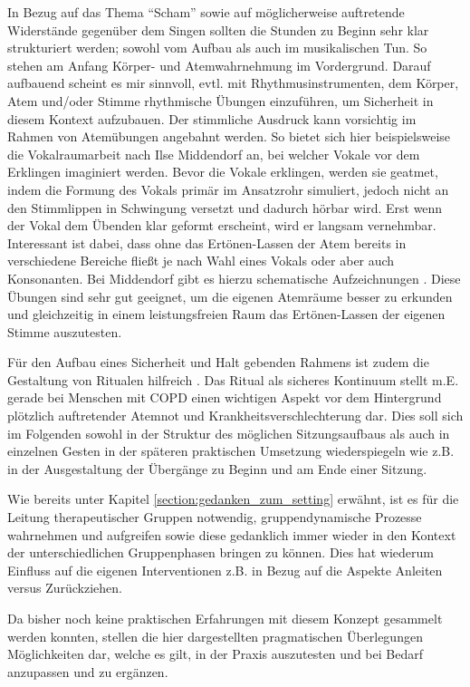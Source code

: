 In Bezug auf das Thema "`Scham"' sowie auf möglicherweise auftretende Widerstände gegenüber dem Singen sollten die Stunden zu Beginn sehr klar strukturiert werden; sowohl vom Aufbau als auch im musikalischen Tun. So stehen am Anfang Körper- und Atemwahrnehmung im Vordergrund. Darauf aufbauend scheint es mir sinnvoll, evtl. mit Rhythmusinstrumenten, dem Körper, Atem und/oder Stimme rhythmische Übungen einzuführen, um Sicherheit in diesem Kontext aufzubauen. Der stimmliche Ausdruck kann vorsichtig im Rahmen von Atemübungen angebahnt werden. So bietet sich hier beispielsweise die Vokalraumarbeit nach Ilse Middendorf an, bei welcher Vokale vor dem Erklingen imaginiert werden. Bevor die Vokale erklingen, werden sie geatmet, indem die Formung des Vokals primär im Ansatzrohr simuliert, jedoch nicht an den Stimmlippen in Schwingung versetzt und dadurch hörbar wird. Erst wenn der Vokal dem Übenden klar geformt erscheint, wird er langsam vernehmbar. Interessant ist dabei, dass ohne das Ertönen-Lassen der Atem bereits in verschiedene Bereiche fließt je nach Wahl eines Vokals oder aber auch Konsonanten. Bei Middendorf gibt es hierzu schematische Aufzeichnungen \autocite[vgl.][60ff.]{middendorf1995}. Diese Übungen sind sehr gut geeignet, um die eigenen Atemräume besser zu erkunden und gleichzeitig in einem leistungsfreien Raum das Ertönen-Lassen der eigenen Stimme auszutesten. 

Für den Aufbau eines Sicherheit und Halt gebenden Rahmens ist zudem die Gestaltung von Ritualen hilfreich \autocite[vgl.][31ff.]{deckervoigt2013}. Das Ritual als sicheres Kontinuum stellt m.E. gerade bei Menschen mit COPD einen wichtigen Aspekt vor dem Hintergrund plötzlich auftretender Atemnot und Krankheitsverschlechterung dar. Dies soll sich im Folgenden sowohl in der Struktur des möglichen Sitzungsaufbaus als auch in einzelnen Gesten in der späteren praktischen Umsetzung wiederspiegeln wie z.B. in der Ausgestaltung der Übergänge zu Beginn und am Ende einer Sitzung.

Wie bereits unter Kapitel \ref{section:gedanken_zum_setting} erwähnt, ist es für die Leitung therapeutischer Gruppen notwendig, gruppendynamische Prozesse wahrnehmen und aufgreifen sowie diese gedanklich immer wieder in den Kontext der unterschiedlichen Gruppenphasen bringen zu können. Dies hat wiederum Einfluss auf die eigenen Interventionen z.B. in Bezug auf die Aspekte Anleiten versus Zurückziehen.

Da bisher noch keine praktischen Erfahrungen mit diesem Konzept gesammelt werden konnten, stellen die hier dargestellten pragmatischen Überlegungen Möglichkeiten dar, welche es gilt, in der Praxis auszutesten und bei Bedarf anzupassen und zu ergänzen. 

